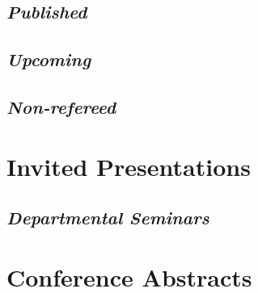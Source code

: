 \documentclass[10pt,a4paper,sans]{moderncv}        %
\begin{document}
\subsection{\textit{Published}} %
\nocite{*}



\subsection{\textit{Upcoming}}%
\renewcommand*{\bibliographyhead}[1]{\subsection{In Preparation}}

\renewcommand*{\bibliographyhead}[1]{\subsection{Non-refereed}}
\subsection{\textit{Non-refereed}}

\section{Invited Presentations}
\renewcommand*{\bibliographyhead}[1]{}

\renewcommand*{\bibliographyhead}[1]{\subsection{Departmental Seminars}}
\subsection{\textit{Departmental Seminars}}

\section{Conference Abstracts}
\renewcommand*{\bibliographyhead}[1]{}
\end{document}
